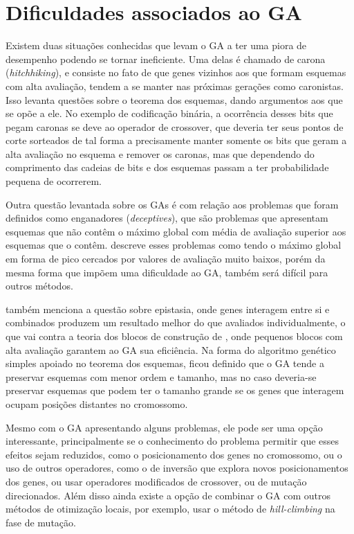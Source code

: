 \section{Dificuldades associados ao GA}
\label{sec:problemas_GA}
Existem duas situações conhecidas que levam o GA a ter uma piora de desempenho podendo se tornar ineficiente. Uma delas é chamado de carona (\textit{hitchhiking}), e consiste no fato de que genes vizinhos aos que formam esquemas com alta avaliação, tendem a se manter nas próximas gerações como caronistas. Isso levanta questões sobre o teorema dos esquemas, dando argumentos aos que se opõe a ele. No exemplo de codificação binária, a ocorrência desses bits que pegam caronas se deve ao operador de crossover, que deveria ter seus pontos de corte sorteados de tal forma a precisamente manter somente os bits que geram a alta avaliação no esquema e remover os caronas, mas que dependendo do comprimento das cadeias de bits e dos esquemas passam a ter probabilidade pequena de ocorrerem. 

Outra questão levantada sobre os GAs é com relação aos problemas que foram definidos como enganadores (\textit{deceptives}), que são problemas que apresentam esquemas que não contêm o máximo global com média de avaliação superior aos esquemas que o contêm. \citeauthor{Linden2008} descreve esses problemas como tendo o máximo global em forma de pico cercados por valores de avaliação muito baixos, porém da mesma forma que impõem uma dificuldade ao GA, também será difícil para outros métodos.

\citeauthor{Spall2003} também menciona a questão sobre epistasia, onde genes interagem entre si e combinados produzem um resultado melhor do que avaliados individualmente, o que vai contra a teoria dos blocos de construção de \citeauthor{Goldberg1989}, onde pequenos blocos com alta avaliação garantem ao GA sua eficiência. Na forma do algoritmo genético simples apoiado no teorema dos esquemas, ficou definido que o GA tende a preservar esquemas com menor ordem e tamanho, mas no caso deveria-se preservar esquemas que podem ter o tamanho grande se os genes que interagem ocupam posições distantes no cromossomo.

Mesmo com o GA apresentando alguns problemas, ele pode ser uma opção interessante, principalmente se o conhecimento do problema permitir que esses efeitos sejam reduzidos, como o posicionamento dos genes no cromossomo, ou o uso de outros operadores, como o de inversão que explora novos posicionamentos dos genes, ou usar operadores modificados de crossover, ou de mutação direcionados. Além disso ainda existe a opção de combinar o GA com outros métodos de otimização locais, por exemplo, usar o método de \textit{hill-climbing} na fase de mutação.
